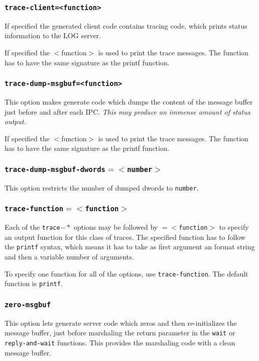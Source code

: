 \subsubsection{{\tt trace-client=<function>}}
If specified the generated client code contains tracing code, which prints
status information to the LOG server.

If specified the $<$function$>$ is used to print the trace messages. The function
has to have the same signature as the printf function.

\subsubsection{{\tt trace-dump-msgbuf=<function>}}
This option makes \dice{} generate code which dumps the content of the message
buffer just before and after each IPC. {\it This may produce an immense amount
of status output.} 

If specified the $<$function$>$ is used to print the trace messages. The function
has to have the same signature as the printf function.

\subsubsection{{\tt trace-dump-msgbuf-dwords$=<$number$>$}}
This option restricts the number of dumped dwords to {\tt number}.

\subsubsection{{\tt trace-function$=<$function$>$}}
Each of the {\tt trace$-*$} options may be followed by {\tt $=<$function$>$}
to specify an output function for this class of traces. The specified function
has to follow the \verb|printf| syntax, which means it has to take as first
argument an format string and then a variable number of arguments.

To specify one function for all of the options, use {\tt trace-function}.
The default function is \verb|printf|.

\subsubsection{{\tt zero-msgbuf}}
This option lets \dice{} generate server code which zeros and then
re-initializes the message buffer, just before marshaling the return parameter 
in the \verb|wait| or 
\verb|reply-and-wait| functions. This provides
the marshaling code with a clean message buffer.

